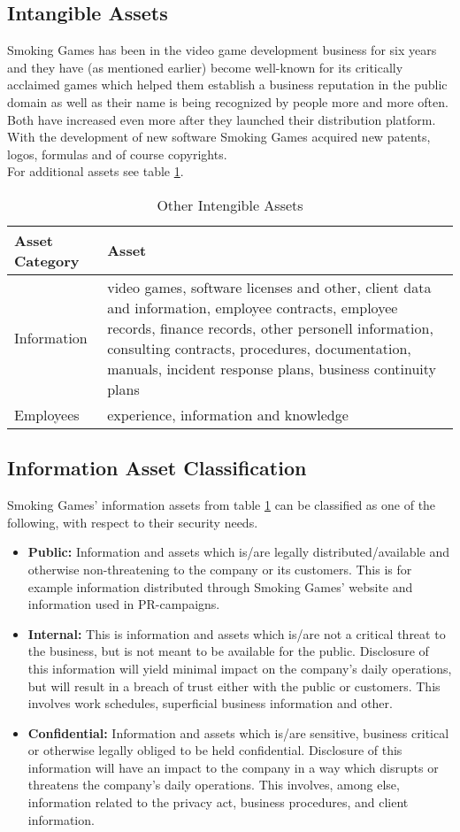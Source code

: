 \subsection{Intangible Assets}
Smoking Games has been in the video game development business for six years and they have (as mentioned earlier) become well-known for its critically acclaimed games which helped them establish a business reputation in the public domain as well as their name is being recognized by people more and more often. Both have increased even more after they launched their distribution platform.\\
With the development of new software Smoking Games acquired new patents, logos, formulas and of course copyrights.\\
For additional assets see table \ref{tab:OtherTangibleAssets}. 
\begin{table}[h]
	\centering
	\begin{tabular}{l | l}
		\textbf{Asset Category} & \textbf{Asset}\\\hline\hline
		Information & \parbox[t]{7cm}{video games, software licenses and other, client data and information, employee contracts, employee records, finance records, other personell information, consulting contracts, procedures, documentation, manuals, incident response plans, business continuity plans}\\\hline
		Employees & \parbox[t]{7cm}{experience, information and knowledge}
	\end{tabular}
	\caption{Other Intengible Assets}\label{tab:OtherTangibleAssets}
\end{table}
\newpage
\subsection{Information Asset Classification}
Smoking Games' information assets from table \ref{tab:OtherTangibleAssets} can be classified as one of the following, with respect to their security needs.\\
\medskip
\begin{itemize}
	\item \textbf{Public:} Information and assets which is/are legally distributed/available and otherwise non-threatening to the company or its customers. This is for example information distributed through Smoking Games' website and information used in PR-campaigns.
	\item \textbf{Internal:} This is information and assets which is/are not a critical threat to the business, but is not meant to be available for the public. Disclosure of this information will yield minimal impact on the company’s daily operations, but will result in a breach of trust either with the public or customers. This involves work schedules, superficial business information and other.
	\item \textbf{Confidential:} Information and assets which is/are sensitive, business critical or otherwise legally obliged to be held confidential. Disclosure of this information will have an impact to the company in a way which disrupts or threatens the company’s daily operations. This involves, among else, information related to the privacy act, business procedures, and client information.
\end{itemize}
